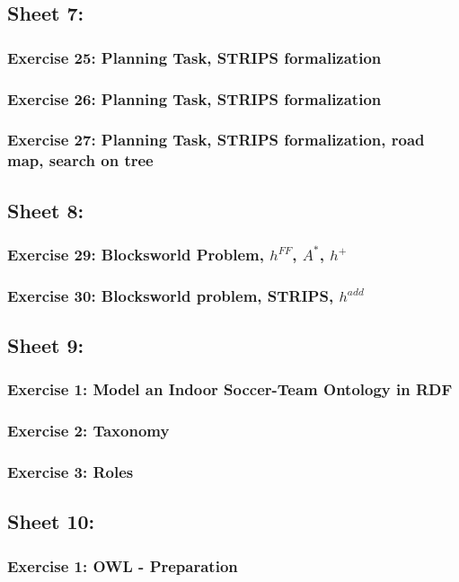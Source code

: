 \documentclass{article}
\begin{document}
    \subsection{Sheet 7:}
        \subsubsection{Exercise 25: Planning Task, STRIPS formalization}
        \subsubsection{Exercise 26: Planning Task, STRIPS formalization}
        \subsubsection{Exercise 27: Planning Task, STRIPS formalization, road map, search on tree}
    \subsection{Sheet 8:}
        \subsubsection{Exercise 29: Blocksworld Problem, $h^{FF}$, $A^*$, $h^+$}
        \subsubsection{Exercise 30: Blocksworld problem, STRIPS, $h^{add}$}
    \subsection{Sheet 9:}
        \subsubsection{Exercise 1: Model an Indoor Soccer-Team Ontology in RDF}
        \subsubsection{Exercise 2: Taxonomy}
        \subsubsection{Exercise 3: Roles}
    \subsection{Sheet 10:}
        \subsubsection{Exercise 1: OWL - Preparation}
\end{document}
